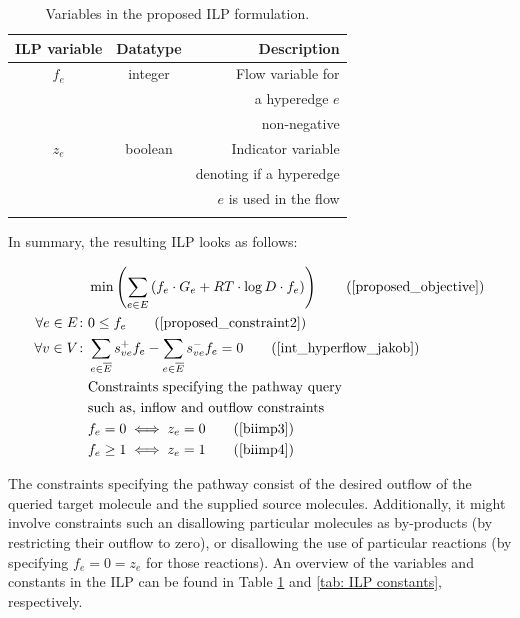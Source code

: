 \begin{table}[!h]
    \centering
    \begin{footnotesize}
    \begin{tabular}{ccr}
        \\\toprule
        ILP variable & Datatype & Description \\
        \midrule
        $f_e$ & integer & Flow variable for\\
        && a hyperedge $e$ \\
        && non-negative \\[1mm]
        $z_e$ & boolean & Indicator variable \\
        && denoting if a hyperedge \\
        && $e$ is used in the flow \\
        \bottomrule\\
    \end{tabular}
    \end{footnotesize}
    \caption{Variables in the proposed ILP formulation.}
    \label{tab: ILP variables}
\end{table}%

In summary, the resulting ILP looks as follows:

\begin{align}
    & \min\left(\sum_{e \in E} \left(f_e\cdot G_e + RT\cdot \log D\cdot f_e\right)\right) \tag{\ref{proposed_objective}} \\
    \forall e \in E\colon & 0 \leq f_e \tag{\ref{proposed_constraint2}} \\
    \forall v\in V \colon &\sum_{ e\in \overline{E} } s_{ve}^+ f_e - \sum_{ e\in \overline{E} } s_{ve}^- f_e = 0 \tag{\ref{int_hyperflow_jakob}}\\
    &\text{Constraints specifying the pathway query} \nonumber\\
    &\text{such as, inflow and outflow constraints} \nonumber\\
    & f_e = 0 \iff z_e = 0 \tag{\ref{biimp3}} \\
    & f_e \geq 1 \iff z_e = 1 \tag{\ref{biimp4}}
\end{align}

The constraints specifying the pathway consist of the desired outflow of the queried target molecule and the supplied source molecules. Additionally, it might involve constraints such an disallowing particular molecules as by-products (by restricting their outflow to zero), or disallowing the use of particular reactions (by specifying $f_e = 0 = z_e$ for those reactions). An overview of the variables and constants in the ILP can be found in Table \ref{tab: ILP variables} and \ref{tab: ILP constants}, respectively.

